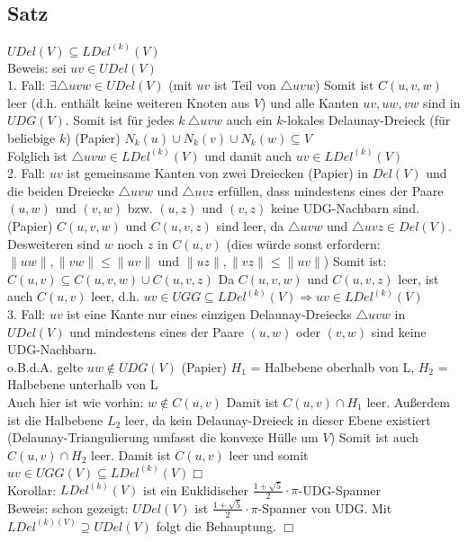 \documentclass{article}
\begin{document}
\subsection*{Satz}
$UDel(V) \subseteq LDel^{(k)}(V)$ \\
Beweis: sei $uv \in UDel(V)$ \\
1. Fall: $\exists \triangle uvw \in UDel(V)$ (mit $uv$ ist Teil von
$\triangle uvw$) Somit ist $C(u,v,w)$ leer (d.h. enthält keine weiteren
Knoten aus $V$) und alle Kanten $uv,uw,vw$ sind in $UDG(V)$. Somit ist
für jedes $k \ \triangle uvw$ auch ein $k$-lokales Delaunay-Dreieck (für
beliebige $k$) (Papier) $N_k(u) \cup N_k(v) \cup N_k(w) \subseteq V$ \\
Folglich ist $\triangle uvw \in LDel^{(k)}(V)$ und damit auch $uv \in
LDel^{(k)}(V)$ \\
2. Fall: $uv$ ist gemeinsame Kanten von zwei Dreiecken (Papier) in
$Del(V)$ und die beiden Dreiecke $\triangle uvw$ und $\triangle uvz$
erfüllen, dass mindestens eines der Paare $(u,w)$ und $(v,w)$ bzw.
$(u,z)$ und $(v,z)$ keine UDG-Nachbarn sind. (Papier) $C(u,v,w)$ und
$C(u,v,z)$ sind leer, da $\triangle uvw$ und $\triangle uvz \in Del(V)$.
Desweiteren sind $w$ noch $z$ in $C(u,v)$ (dies würde sonst erfordern:
$\|uw\|,\|vw\| \leq \|uv\|$ und $\|uz\|,\|vz\| \leq \|uv\|$) Somit ist:
$C(u,v) \subseteq C(u,v,w) \cup C(u,v,z)$ Da $C(u,v,w)$ und $C(u,v,z)$
leer, ist auch $C(u,v)$ leer, d.h. $uv \in UGG \subseteq LDel^{(k)}(V)
\Rightarrow uv \in LDel^{(k)}(V)$ \\
3. Fall: $uv$ ist eine Kante nur eines einzigen Delaunay-Dreiecks
$\triangle uvw$ in $UDel(V)$ und mindestens eines der Paare $(u,w)$ oder
$(v,w)$ sind keine UDG-Nachbarn. \\
o.B.d.A. gelte $uw \notin UDG(V)$ (Papier) $H_1$ = Halbebene oberhalb
von L, $H_2$ = Halbebene unterhalb von L \\
Auch hier ist wie vorhin: $w \notin C(u,v)$ Damit ist $C(u,v) \cap H_1$
leer. Außerdem ist die Halbebene $L_2$ leer, da kein Delaunay-Dreieck in
dieser Ebene existiert (Delaunay-Triangulierung umfasst die konvexe
Hülle um $V$) Somit ist auch $C(u,v) \cap H_2$ leer. Damit ist $C(u,v)$
leer und somit $uv \in UGG(V) \subseteq LDel^{(k)}(V) \Box$ \\
Korollar: $LDel^{(k)}(V)$ ist ein Euklidischer $\displaystyle
\frac{1+\sqrt{5}}{2}\cdot\pi$-UDG-Spanner \\
Beweis: schon gezeigt: $UDel(V)$ ist $\displaystyle
\frac{1+\sqrt{5}}{2}\cdot\pi$-Spanner von UDG. Mit $LDel^{(k)(V)}
\supseteq UDel(V)$ folgt die Behauptung. $\Box$ \\
\end{document}
